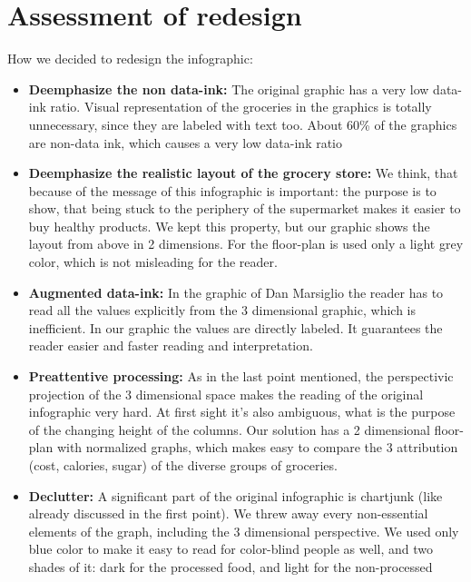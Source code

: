 \section{Assessment of redesign}

How we decided to redesign the infographic:

\begin{itemize}
	\item \textbf{Deemphasize the non data-ink:} The original graphic has a very
		low data-ink ratio. Visual representation of the groceries in the graphics
		is totally unnecessary, since they are labeled with text too. About 60\% of
		the graphics are non-data ink, which causes a very low data-ink ratio

	\item \textbf{Deemphasize the realistic layout of the grocery store:} We
		think, that because of the message of this infographic is important: the
		purpose is to show, that being stuck to the periphery of the supermarket
		makes it easier to buy healthy products. We kept this property, but our
		graphic shows the layout from above in 2 dimensions. For the floor-plan is
		used only a light grey color, which is not misleading for the reader.
		
	\item \textbf{Augmented data-ink:} In the graphic of Dan Marsiglio the reader
		has to read all the values explicitly from the 3 dimensional graphic, which
		is inefficient. In our graphic the values are directly labeled. It
		guarantees the reader easier and faster reading and interpretation.

	\item \textbf{Preattentive processing:} As in the last point mentioned, the
		perspectivic projection of the 3 dimensional space makes the reading of
		the original infographic very hard. At first sight it's also ambiguous,
		what is the purpose of the changing height of the columns. Our solution
		has a 2 dimensional floor-plan with normalized graphs, which makes easy to
		compare the 3 attribution (cost, calories, sugar) of the diverse groups of
		groceries.

	\item \textbf{Declutter:} A significant part of the original infographic is
		chartjunk (like already discussed in the first point). We threw away every
		non-essential elements of the graph, including the 3 dimensional
		perspective. We used only blue color to make it easy to read for color-blind
		people as well, and two shades of it: dark for the processed food, and light
		for the non-processed


\end{itemize}
